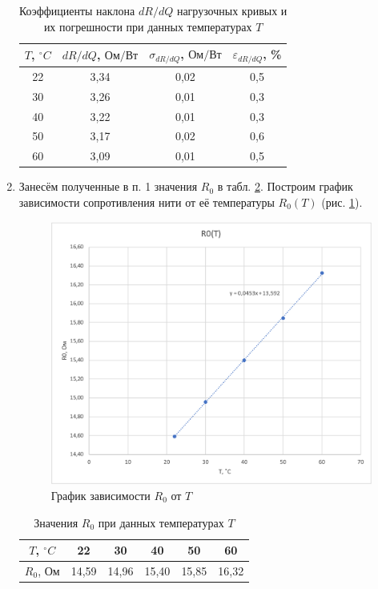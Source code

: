 \documentclass[a4paper, 12pt]{article}
\begin{document}
\begin{enumerate}
        \begin{table}[ht]
            \centering
            \captionsetup{justification=centering, margin=2cm}
            \begin{tabular}{|c|c|c|c|}
                \hline
                $T$, $^\circ C$ & $dR / dQ$, $Ом / Вт$ & $\sigma_{dR / dQ}$, $Ом / Вт$ & $\varepsilon_{dR / dQ}$, \% \\
                \hline
                22 & 3,34 & 0,02 & 0,5 \\
                \hline
                30 & 3,26 & 0,01 & 0,3 \\
                \hline
                40 & 3,22 & 0,01 & 0,3 \\
                \hline
                50 & 3,17 & 0,02 & 0,6 \\
                \hline
                60 & 3,09 & 0,01 & 0,5 \\
                \hline
            \end{tabular}
            \caption{Коэффициенты наклона $dR / dQ$ нагрузочных кривых и их погрешности при данных температурах $T$}
            \label{table3}
        \end{table}
        
        \item[2.] Занесём полученные в п. 1 значения $R_0$ в табл. \ref{table4}. Построим график зависимости сопротивления нити от её температуры $R_0(T)$ (рис. \ref{pic4}).
        
        \begin{figure}[ht]
            \centering
            \includegraphics[width=0.55\linewidth]{images/R(T).png}
            \caption{График зависимости $R_0$ от $T$}
            \label{pic4}
        \end{figure}
        
        \begin{table}[ht]
            \centering
            \begin{tabular}{|c|c|c|c|c|c|}
                \hline
                $T$, $^\circ C$ & 22 & 30 & 40 & 50 & 60 \\
                \hline
                $R_0$, Ом & 14,59 & 14,96 & 15,40 & 15,85 & 16,32 \\
                \hline
            \end{tabular}
            \caption{Значения $R_0$ при данных температурах $T$}
            \label{table4}
        \end{table}
        

\end{enumerate}
\end{document}
